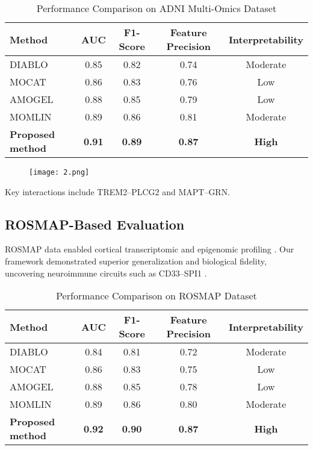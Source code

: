 \documentclass[12pt]{article}
\begin{document}
\begin{table}[H]
\centering
\caption{Performance Comparison on ADNI Multi-Omics Dataset}
\begin{tabular}{lcccc}
\toprule
\textbf{Method} & \textbf{AUC} & \textbf{F1-Score} & \textbf{Feature Precision} & \textbf{Interpretability} \\
\midrule
DIABLO & 0.85 & 0.82 & 0.74 & Moderate \\
MOCAT & 0.86 & 0.83 & 0.76 & Low \\
AMOGEL & 0.88 & 0.85 & 0.79 & Low \\
MOMLIN & 0.89 & 0.86 & 0.81 & Moderate \\
\textbf{Proposed method} & \textbf{0.91} & \textbf{0.89} & \textbf{0.87} & \textbf{High} \\
\bottomrule
\end{tabular}
\label{tab:adni_comparison}
\end{table}

\begin{figure}[H]
\centering
\texttt{[image: 2.png]}
\label{fig:adni_gene_map}
\end{figure}
Key interactions include TREM2–PLCG2 and MAPT–GRN.

\subsection{ROSMAP-Based Evaluation}
ROSMAP data enabled cortical transcriptomic and epigenomic profiling \citep{rosmap2024frontiers, mostafavi2018molecular, de2019integrative}. Our framework demonstrated superior generalization and biological fidelity, uncovering neuroimmune circuits such as CD33–SPI1 \citep{zhou2020cd33, naj2011common, raj2012network}.

\begin{table}[H]
\centering
\caption{Performance Comparison on ROSMAP Dataset}
\begin{tabular}{lcccc}
\toprule
\textbf{Method} & \textbf{AUC} & \textbf{F1-Score} & \textbf{Feature Precision} & \textbf{Interpretability} \\
\midrule
DIABLO & 0.84 & 0.81 & 0.72 & Moderate \\
MOCAT & 0.86 & 0.83 & 0.75 & Low \\
AMOGEL & 0.88 & 0.85 & 0.78 & Low \\
MOMLIN & 0.89 & 0.86 & 0.80 & Moderate \\
\textbf{Proposed method} & \textbf{0.92} & \textbf{0.90} & \textbf{0.87} & \textbf{High} \\
\bottomrule
\end{tabular}
\label{tab:rosmap_comparison}
\end{table}
\end{document}
